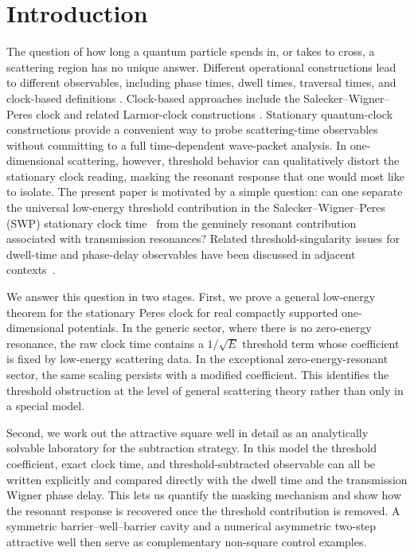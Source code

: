 \documentclass[aps,pra,preprint,notitlepage,nofootinbib]{revtex4-2}
\begin{document}
\maketitle
\newpage
\section{Introduction}

The question of how long a quantum particle spends in, or takes to cross, a
scattering region has no unique answer.  Different operational constructions
lead to different observables, including phase times, dwell times, traversal
times, and clock-based definitions
\cite{Hauge1989,ButtikerLandauer1982,LandauerMartin1994,
MugaLeavens2000,Winful2006,Field2022}.
Clock-based approaches include the Salecker--Wigner--Peres clock and related
Larmor-clock constructions
\cite{SaleckerWigner1958,Peres1980,Buttiker1983,Leavens1993,Davies2005,
Calcada2009,Lunardi2011}.
Stationary quantum-clock constructions provide a convenient way to probe
scattering-time observables without committing to a full time-dependent
wave-packet analysis. In one-dimensional scattering, however, threshold behavior can qualitatively distort the stationary clock reading, masking the resonant response that one would most like to isolate. The present paper is motivated by a simple question: can one separate the universal low-energy threshold contribution in the Salecker--Wigner--Peres (SWP) stationary clock time~\cite{SaleckerWigner1958,Peres1980,Davies2005,Sokolovski2017} from the genuinely resonant contribution associated with transmission resonances? Related threshold-singularity issues for dwell-time and phase-delay observables have been discussed in adjacent contexts~\cite{Kelkar2007}.

We answer this question in two stages. First, we prove a general low-energy theorem for the stationary Peres clock for real compactly supported one-dimensional potentials. In the generic sector, where there is no zero-energy resonance, the raw clock time contains a $1/\sqrt{E}$ threshold term whose coefficient is fixed by low-energy scattering data. In the exceptional zero-energy-resonant sector, the same scaling persists with a modified coefficient. This identifies the threshold obstruction at the level of general scattering theory rather than only in a special model.

Second, we work out the attractive square well in detail as an analytically
solvable laboratory for the subtraction strategy. In this model the threshold
coefficient, exact clock time, and threshold-subtracted observable can all be
written explicitly and compared directly with the dwell time and the
transmission Wigner phase delay. This lets us quantify the masking mechanism
and show how the resonant response is recovered once the threshold contribution
is removed. A symmetric barrier--well--barrier cavity and a numerical
asymmetric two-step attractive well then serve as complementary non-square
control examples.
\end{document}
